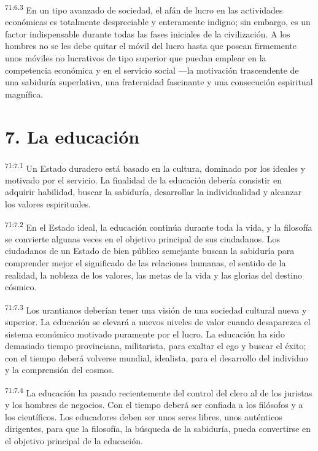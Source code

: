 \par
\textsuperscript{71:6.3} En un tipo avanzado de sociedad, el afán de lucro en las actividades económicas es totalmente despreciable y enteramente indigno; sin embargo, es un factor indispensable durante todas las fases iniciales de la civilización. A los hombres no se les debe quitar el móvil del lucro hasta que posean firmemente unos móviles no lucrativos de tipo superior que puedan emplear en la competencia económica y en el servicio social ---la motivación trascendente de una sabiduría superlativa, una fraternidad fascinante y una consecución espiritual magnífica.

\section*{7. La educación}
\par
\textsuperscript{71:7.1} Un Estado duradero está basado en la cultura, dominado por los ideales y motivado por el servicio. La finalidad de la educación debería consistir en adquirir habilidad, buscar la sabiduría, desarrollar la individualidad y alcanzar los valores espirituales.

\par
\textsuperscript{71:7.2} En el Estado ideal, la educación continúa durante toda la vida, y la filosofía se convierte algunas veces en el objetivo principal de sus ciudadanos. Los ciudadanos de un Estado de bien público semejante buscan la sabiduría para comprender mejor el significado de las relaciones humanas, el sentido de la realidad, la nobleza de los valores, las metas de la vida y las glorias del destino cósmico.

\par
\textsuperscript{71:7.3} Los urantianos deberían tener una visión de una sociedad cultural nueva y superior. La educación se elevará a nuevos niveles de valor cuando desaparezca el sistema económico motivado puramente por el lucro. La educación ha sido demasiado tiempo provinciana, militarista, para exaltar el ego y buscar el éxito; con el tiempo deberá volverse mundial, idealista, para el desarrollo del individuo y la comprensión del cosmos.

\par
\textsuperscript{71:7.4} La educación ha pasado recientemente del control del clero al de los juristas y los hombres de negocios. Con el tiempo deberá ser confiada a los filósofos y a los científicos. Los educadores deben ser unos seres libres, unos auténticos dirigentes, para que la filosofía, la búsqueda de la sabiduría, pueda convertirse en el objetivo principal de la educación.

